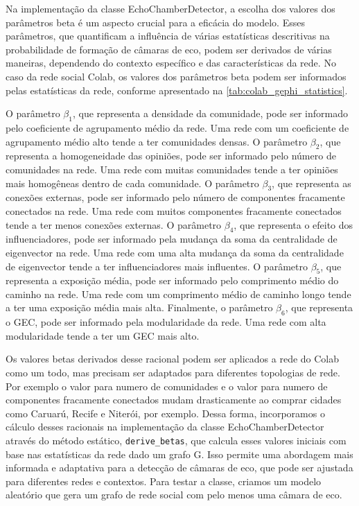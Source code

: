 Na implementação da classe EchoChamberDetector, a escolha dos valores dos parâmetros beta é um aspecto crucial para a eficácia do modelo. Esses parâmetros, que quantificam a influência de várias estatísticas descritivas na probabilidade de formação de câmaras de eco, podem ser derivados de várias maneiras, dependendo do contexto específico e das características da rede. No caso da rede social Colab, os valores dos parâmetros beta podem ser informados pelas estatísticas da rede, conforme apresentado na \autoref{tab:colab_gephi_statistics}.

O parâmetro $\beta_1$, que representa a densidade da comunidade, pode ser informado pelo coeficiente de agrupamento médio da rede. Uma rede com um coeficiente de agrupamento médio alto tende a ter comunidades densas. O parâmetro $\beta_2$, que representa a homogeneidade das opiniões, pode ser informado pelo número de comunidades na rede. Uma rede com muitas comunidades tende a ter opiniões mais homogêneas dentro de cada comunidade. O parâmetro $\beta_3$, que representa as conexões externas, pode ser informado pelo número de componentes fracamente conectados na rede. Uma rede com muitos componentes fracamente conectados tende a ter menos conexões externas. O parâmetro $\beta_4$, que representa o efeito dos influenciadores, pode ser informado pela mudança da soma da centralidade de eigenvector na rede. Uma rede com uma alta mudança da soma da centralidade de eigenvector tende a ter influenciadores mais influentes. O parâmetro $\beta_5$, que representa a exposição média, pode ser informado pelo comprimento médio do caminho na rede. Uma rede com um comprimento médio de caminho longo tende a ter uma exposição média mais alta. Finalmente, o parâmetro $\beta_6$, que representa o GEC, pode ser informado pela modularidade da rede. Uma rede com alta modularidade tende a ter um GEC mais alto.

Os valores betas derivados desse racional podem ser aplicados a rede do Colab como um todo, mas precisam ser adaptados para diferentes topologias de rede. Por exemplo o valor para numero de comunidades e o valor para numero de componentes fracamente conectados mudam drasticamente ao comprar cidades como Caruarú, Recife e Niterói, por exemplo. Dessa forma, incorporamos o cálculo desses racionais na implementação da classe EchoChamberDetector através do método estático, \texttt{derive\_betas}, que calcula esses valores iniciais com base nas estatísticas da rede dado um grafo G. Isso permite uma abordagem mais informada e adaptativa para a detecção de câmaras de eco, que pode ser ajustada para diferentes redes e contextos. Para testar a classe, criamos um modelo aleatório que gera um grafo de rede social com pelo menos uma câmara de eco.

